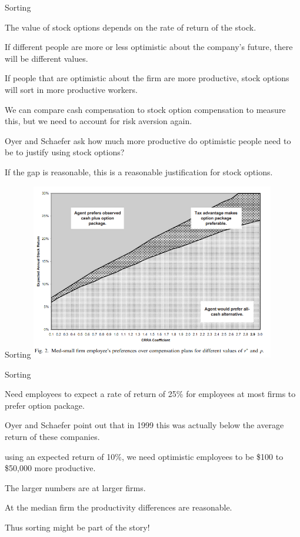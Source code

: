 \documentclass[aspectratio=169,usenames,dvipsnames]{beamer}
\newenvironment{wideitemize}{\itemize\addtolength{\itemsep}{10pt}}{\enditemize}
\begin{document}
\begin{frame}{Sorting}
    \begin{wideitemize}
        \item The value of stock options depends on the rate of return of the stock.
        \item If different people are more or less optimistic about the company's future, there will be different values.
        \item If people that are optimistic about the firm are more productive, stock options will sort in more productive workers.
        \item We can compare cash compensation to stock option compensation to measure this, but we need to account for risk aversion again.
        \item Oyer and Schaefer ask how much more productive do optimistic people need to be to justify using stock options?
        \item If the gap is reasonable, this is a reasonable justification for stock options.
    \end{wideitemize}
\end{frame}
\begin{frame}{Sorting}
    \centering\includegraphics[width=0.8\textwidth]{pictures/sorting_stock.png}
\end{frame}

\begin{frame}{Sorting}
    \begin{wideitemize}
        \item Need employees to expect a rate of return of 25\% for employees at most firms to prefer option package.
        \item Oyer and Schaefer point out that in 1999 this was actually below the average return of these companies.
        \item using an expected return of 10\%, we need optimistic employees to be \$100 to \$50,000 more productive.
        \item The larger numbers are at larger firms.
        \item At the median firm the productivity differences are reasonable.
        \item Thus sorting might be part of the story!
    \end{wideitemize}
\end{frame}
\end{document}
